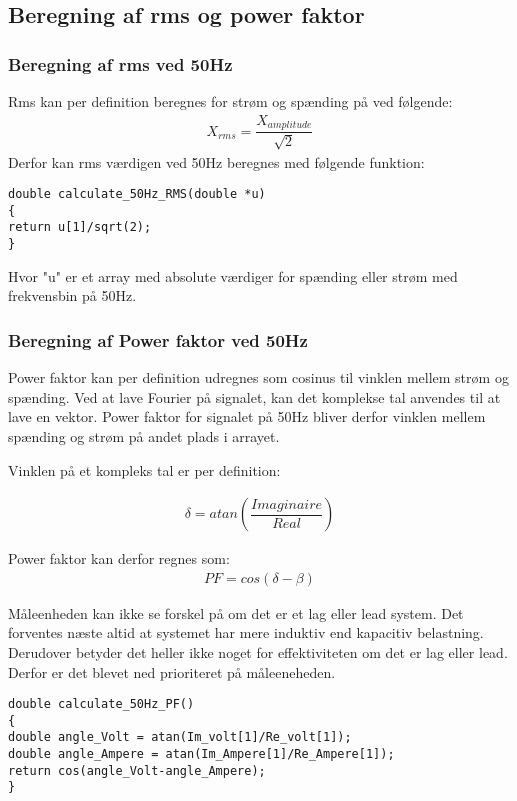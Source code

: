 \subsection{Beregning af rms og power faktor}

\subsubsection{Beregning af rms ved 50Hz}
Rms kan per definition beregnes for strøm og spænding på ved følgende: 
\begin{align}
 X_{rms}= \dfrac{X_{amplitude}}{\sqrt{2}}
\end{align}
Derfor kan rms værdigen ved 50Hz beregnes med følgende funktion:
\begin{lstlisting}
double calculate_50Hz_RMS(double *u)
{
return u[1]/sqrt(2);  
}
\end{lstlisting}

Hvor "u" er et array med absolute værdiger for spænding eller strøm med frekvensbin på 50Hz.

\subsubsection{Beregning af Power faktor ved 50Hz}

Power faktor kan per definition udregnes som cosinus til vinklen mellem strøm og spænding. Ved at lave Fourier på signalet, kan det komplekse tal anvendes til at lave en vektor. Power faktor for signalet på 50Hz bliver derfor vinklen mellem spænding og strøm på andet plads i arrayet.

Vinklen på et kompleks tal er per definition:

\begin{align}
\delta = atan(\dfrac{Imaginaire}{Real})
\end{align}

Power faktor kan derfor regnes som:
\begin{align}
PF = cos(\delta - \beta)
\end{align}

Måleenheden kan ikke se forskel på om det er et lag eller lead system. Det forventes næste altid at systemet har mere induktiv end kapacitiv belastning. Derudover betyder det heller ikke noget for effektiviteten om det er lag eller lead. Derfor er det blevet ned prioriteret på måleeneheden.

\begin{lstlisting}
double calculate_50Hz_PF()
{
double angle_Volt = atan(Im_volt[1]/Re_volt[1]);
double angle_Ampere = atan(Im_Ampere[1]/Re_Ampere[1]);    
return cos(angle_Volt-angle_Ampere);
}
\end{lstlisting}
 
    

  
